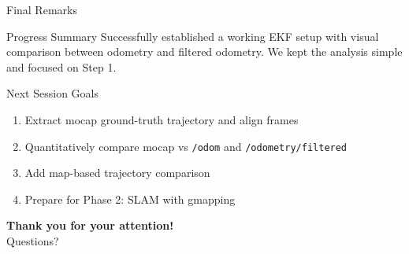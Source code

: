 \documentclass[10pt]{beamer}
\begin{document}
\begin{frame}{Final Remarks}
\begin{block}{Progress Summary}
Successfully established a working EKF setup with visual comparison between odometry and filtered odometry. We kept the analysis simple and focused on Step 1.
\end{block}

\begin{block}{Next Session Goals}
\begin{enumerate}
    \item Extract mocap ground-truth trajectory and align frames
    \item Quantitatively compare mocap vs \texttt{/odom} and \texttt{/odometry/filtered}
    \item Add map-based trajectory comparison
    \item Prepare for Phase 2: SLAM with gmapping
\end{enumerate}
\end{block}

\begin{center}
\Large \textbf{Thank you for your attention!} \\
\vspace{0.5cm}
\normalsize Questions?
\end{center}
\end{frame}
\end{document}
